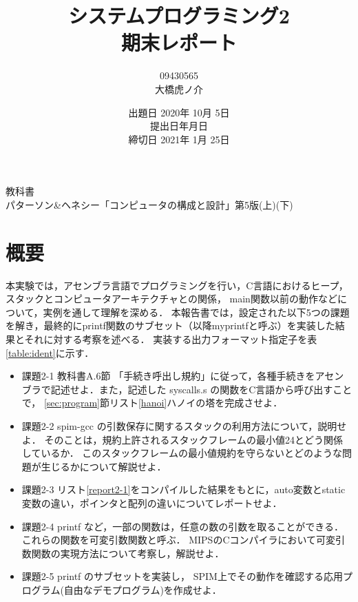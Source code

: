 \documentclass[11pt]{jarticle}
\begin{document}
\title{システムプログラミング2\\期末レポート}
\author{09430565\\大橋虎ノ介}
\date{出題日 2020年 10月 5日\\
提出日\number\year 年\number\month 月\number\day 日\\
締切日 2021年 1月 25日}

\maketitle
\begin{center}
教科書\\
 パターソン\&ヘネシー「コンピュータの構成と設計」第5版(上)(下)
\end{center}
\newpage

\section{概要} \label{sec:abstract}

本実験では，アセンブラ言語でプログラミングを行い，C言語におけるヒープ，
スタックとコンピュータアーキテクチャとの関係， main関数以前の動作などについて，実例を通して理解を深める．
本報告書では，設定された以下5つの課題を解き，最終的にprintf関数のサブセット（以降myprintfと呼ぶ）を実装した結果とそれに対する考察を述べる．
実装する出力フォーマット指定子を表\ref{table:ident}に示す．

\begin{itemize}
  \item 課題2-1 教科書A.6節 「手続き呼出し規約」に従って，各種手続きをアセンブラで記述せよ．また，記述した syscalls.s の関数をC言語から呼び出すことで， \ref{sec:program}節リスト\ref{hanoi}ハノイの塔を完成させよ．
  \item 課題2-2 spim-gcc の引数保存に関するスタックの利用方法について，説明せよ． そのことは，規約上許されるスタックフレームの最小値24とどう関係しているか． このスタックフレームの最小値規約を守らないとどのような問題が生じるかについて解説せよ．
  \item 課題2-3 リスト\ref{report2-1}をコンパイルした結果をもとに，auto変数とstatic変数の違い，ポインタと配列の違いについてレポートせよ．
  \item 課題2-4 printf など，一部の関数は，任意の数の引数を取ることができる． これらの関数を可変引数関数と呼ぶ． MIPSのCコンパイラにおいて可変引数関数の実現方法について考察し，解説せよ．
  \item 課題2-5 printf のサブセットを実装し， SPIM上でその動作を確認する応用プログラム(自由なデモプログラム)を作成せよ．
\end{itemize}
\end{document}
